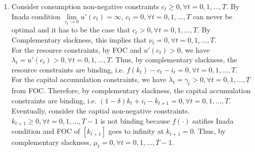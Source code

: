 \documentclass{article}
\begin{document}
\begin{enumerate}
\begin{enumerate}
\begin{enumerate}
\begin{equation*}
\begin{aligned}
                    &\beta^t\gamma_t\ge0,\text{ for }t=0,1,\dots,T\\
                    &\beta^t\mu_t\ge0,\text{ for }t=0,1,\dots,T\\
                    &\beta^t\nu_t\ge0,\text{ for }t=0,1,\dots,T
                \end{aligned}\right.
            \end{equation*}
            \item Complementary Slackness:
            \begin{equation*}
                \left\{\begin{aligned}
                    &\beta^t\lambda_t(f(k_t)-c_t-i_t)=0,\text{ for }t=0,1,\dots,T\\
                    &\beta^t\gamma_t[(1-\delta)k_t+i_t-k_{t+1}]=0,\text{ for }t=0,1,\dots,T\\
                    &\beta^t\mu_tk_{t+1}=0,\text{ for }t=0,1,\dots,T\\
                    &\beta^t\nu_tc_t=0,\text{ for }t=0,1,\dots,T
                \end{aligned}\right.
            \end{equation*}
        \end{enumerate}
        \item Consider consumption non-negative constraints $c_t\ge0,\forall t=0,1,\dots,T$.
        By Inada condition $\lim\limits_{c_t\to0}{u}'(c_t)=\infty$, $c_t=0,\forall t=0,1,\dots,T$ can never be optimal and it has to be the case that $c_t>0,\forall t=0,1,\dots,T$.
        By Complementary slackness, this implies that $\nu_t=0,\forall t=0,1,\dots,T$.\\
        For the resource constraints, by FOC and ${u}'(c_t)>0$, we have $\lambda_t={u}'(c_t)>0,\forall t=0,1,\dots,T$. Thus, by complementary slackness, the resource constraints are binding, i.e. $f(k_t)-c_t-i_t=0,\forall t=0,1,\dots,T$.\\
        For the capital accumulation constraints, we have $\lambda_t=\gamma_t>0,\forall t=0,1,\dots,T$ from FOC. Therefore, by complementary slackness, the capital accumulation constraints are binding, i.e. $(1-\delta)k_t+i_t-k_{t+1}=0,\forall t=0,1,\dots,T$.\\
        Eventually, consider the captial non-negative constraints. $k_{t+1}\ge0,\forall t=0,1,\dots,T-1$ is not binding because $f(\cdot)$ satifies Inada condition and FOC of \([k_{t+1}]\) goes to infinity at \(k_{t+1}=0\). Thus, by complementary slackness, $\mu_t=0,\forall t=0,1,\dots,T-1$.

\end{enumerate}
\end{enumerate}
\end{document}
